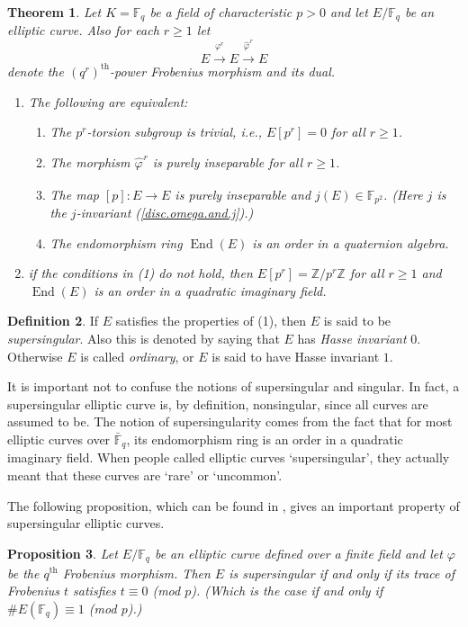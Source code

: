 \documentclass{article}
\numberwithin{equation}{section}
\newtheorem{theorem}{Theorem}[subsection]
\newtheorem{proposition}[theorem]{Proposition}
\theoremstyle{definition}
\newtheorem{definition}[theorem]{Definition}
\newcommand{\ZZ}{{\mathbb Z}} %
\newcommand{\Zmod}[1]{\ZZ / #1\ZZ} %
\newcommand{\FF}[1]{{\mathbb F}_{#1}} %
\newcommand{\FFCL}[1]{{\bar {\mathbb F}}_{#1}} %
\newcommand{\frob}[1][]{\varphi_{#1}} %
\newcommand{\Endring}[1]{\operatorname{End} (#1)} %
\begin{document}
\begin{theorem}\label{FFEndring}
Let $K=\FF{q}$ be a field of characteristic $p>0$ and let $E/\FF{q}$ be an elliptic curve. Also for each $r \geq 1$ let $$E \overset{\frob^r}{\longrightarrow} E \overset{\hat{\frob}^r}{\longrightarrow} E$$ denote the $(q^r)^\text{th}$-power Frobenius morphism and its dual.
\begin{enumerate}
\item The following are equivalent:
\begin{enumerate}
\item The $p^r$-torsion subgroup is trivial, i.e., $E[p^r] = 0$ for all $r \geq 1$.
\item The morphism $\hat{\frob}^r$ is purely inseparable for all $r \geq 1$.
\item The map $[p]:E \rightarrow E$ is purely inseparable and $j(E) \in \FF{p^2}$. (Here $j$ is the $j$-invariant (\ref{disc.omega.and.j}).)
\item The endomorphism ring $\Endring{E}$ is an order in a quaternion algebra.
\end{enumerate}
\item if the conditions in (1) do not hold, then $E[p^r] = \Zmod{p^r}$ for all $r \geq 1$ and $\Endring{E}$ is an order in a quadratic imaginary field.
\end{enumerate}
\end{theorem}

\begin{definition}
If $E$ satisfies the properties of (1), then $E$ is said to be \emph{supersingular}. Also this is denoted by saying that $E$ has \emph{Hasse invariant} $0$. Otherwise $E$ is called \emph{ordinary}, or $E$ is said to have Hasse invariant $1$.
\end{definition}

It is important not to confuse the notions of supersingular and singular. In fact, a supersingular elliptic curve is, by definition, nonsingular, since all curves are assumed to be. The notion of supersingularity comes from the fact that for most elliptic curves over $\FFCL{q}$, its endomorphism ring is an order in a quadratic imaginary field. When people called elliptic curves `supersingular', they actually meant that these curves are `rare' or `uncommon'.\par 
The following proposition, which can be found in \cite[4.31]{Waterhouse}, gives an important property of supersingular elliptic curves. 

\begin{proposition}\label{sstrace}
Let $E/\FF{q}$ be an elliptic curve defined over a finite field and let $\frob$ be the $q^\text{th}$ Frobenius morphism. Then $E$ is supersingular if and only if its trace of Frobenius $t$ satisfies $t\equiv 0$ (mod $p$). (Which is the case if and only if $\#E(\FF{q}) \equiv 1$ (mod $p$).)
\end{proposition} 
\end{document}
